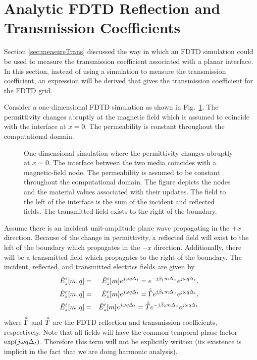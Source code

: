 \section{Analytic FDTD Reflection and Transmission
  Coefficients}

Section \ref{sec:measureTrans} discussed the way in which an FDTD
simulation could be used to measure the transmission coefficient
associated with a planar interface.  In this section, instead of using
a simulation to measure the transmission coefficient, an expression
will be derived that gives the transmission coefficient for the FDTD
grid.

Consider a one-dimensional FDTD simulation as shown in
Fig.\ \ref{fig:oneDHalfSpace}.  The permittivity changes abruptly at
the magnetic field which is assumed to coincide with the interface at
$x=0$.  The permeability is constant throughout the computational
domain.  

\begin{figure}
  \begin{center}
  \end{center} \caption{One-dimensional simulation where the
  permittivity changes abruptly at $x=0$.  The interface between the
  two media coincides with a magnetic-field node.  The permeability is
  assumed to be constant throughout the computational domain.  The
  figure depicts the nodes and the material values associated with
  their updates.  The field to the left of the interface is the sum of
  the incident and reflected fields.  The transmitted field exists to
  the right of the boundary.}  \label{fig:oneDHalfSpace}
\end{figure}

Assume there is an incident unit-amplitude plane wave propagating in
the $+x$ direction.  Because of the change in permittivity, a
reflected field will exist to the left of the boundary which
propagates in the $-x$ direction.  Additionally, there will be a
transmitted field which propagates to the right of the boundary.  The
incident, reflected, and transmitted electrics fields are given by
\begin{eqnarray}
   \hat{E}_z^{i}[m,q] &=& \hat{E}_z^{i}[m] e^{j\omega q\Delta_t} =
                e^{-j\tilde{\beta}_1 m\Delta_x}e^{j\omega q\Delta_t},
     \label{eq:eInc} \\
   \hat{E}_z^{r}[m,q] &=& \hat{E}_z^{r}[m] e^{j\omega q\Delta_t} =
                \hat{\tilde{\Gamma}} e^{j\tilde{\beta}_1 m\Delta_x}e^{j\omega q\Delta_t}, \\
   \hat{E}_z^{t}[m,q] &=& \hat{E}_z^{t}[m] e^{j\omega q\Delta_t} =
                \hat{\tilde{T}} e^{-j\tilde{\beta}_2 m\Delta_x}e^{j\omega q\Delta_t}
     \label{eq:eTrans}
\end{eqnarray}
where $\hat{\tilde{\Gamma}}$ and $\hat{\tilde{T}}$ are the FDTD reflection and transmission
coefficients, respectively.  Note that all fields will have the
common temporal phase factor $\exp(j\omega q\Delta_t)$.  Therefore this
term will not be explicitly written (its existence is implicit in the
fact that we are doing harmonic analysis).

